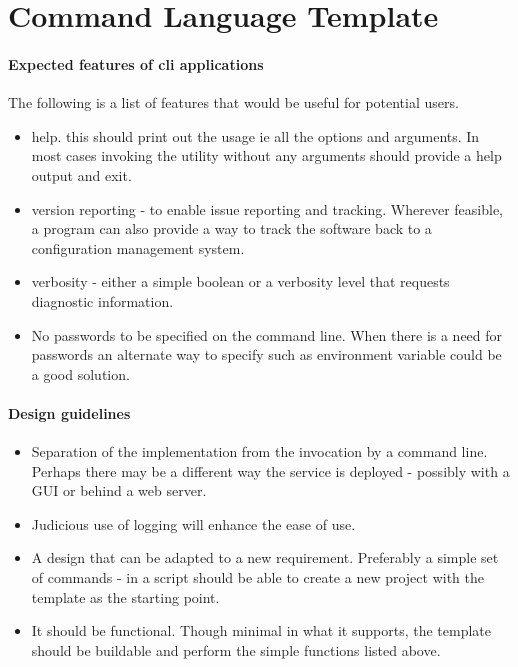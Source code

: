 \documentclass[12pt, a4paper]{article} %
\begin{document}
\section{Command Language Template}

\paragraph{Expected features of cli applications}

The following is a list of features that would be useful for potential users.

\begin{itemize}
    \item help. this should print out the usage ie all the options and arguments. In most cases invoking the utility without any arguments should provide a help output and exit.
    \item version reporting - to enable issue reporting and tracking. Wherever feasible, a program can also provide a way to track the software back to a configuration management system.
    \item verbosity - either a simple boolean or a verbosity level that requests diagnostic information.
    \item No passwords to be specified on the command line. When there is a need for passwords an alternate way to specify such as environment variable could be a good solution.
\end{itemize}

\paragraph{Design guidelines}

\begin{itemize}
    \item Separation of the implementation from the invocation by a command line. Perhaps there may be a different way the service is deployed - possibly with a GUI or behind a web server.
    \item Judicious use of logging will enhance the ease of use.
    \item A design that can be adapted to a new requirement. Preferably a simple set of commands - in a script should be able to create a new project with the template as the starting point.
    \item It should be functional. Though minimal in what it supports, the template should be buildable and perform the simple functions listed above.
\end{itemize}
\end{document}
